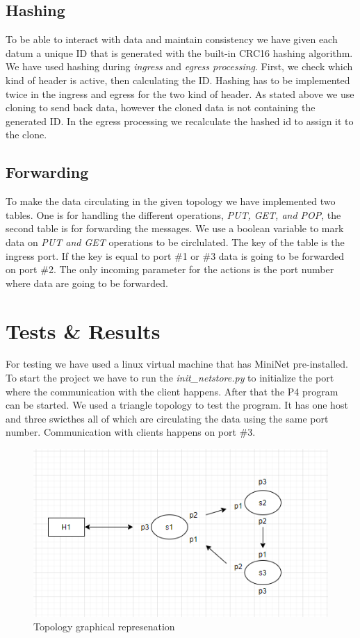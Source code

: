 \documentclass[sigconf,natbib=false]{acmart}
\begin{document}
\subsection{Hashing}
To be able to interact with data and maintain consistency we have given each datum a unique ID that is generated with the built-in CRC16 hashing \cite{hashing2} algorithm. We have used hashing during \textit{ingress} and \textit{egress processing}. First, we check which kind of header is active, then calculating the ID. Hashing has to be implemented twice in the ingress and egress for the two kind of header. As stated above we use cloning to send back data, however the cloned data is not containing the generated ID. In the egress processing we recalculate the hashed id to assign it to the clone.
\cite{hashing1}
\subsection{Forwarding}
To make the data circulating in the given topology we have implemented two tables. One is for handling the different operations, \textit{PUT, GET, and POP}, the second table is for forwarding the messages. We use a boolean variable to mark data on \textit{PUT and GET} operations to be circlulated. The key of the table is the ingress port. If the key is equal to port \#1 or \#3 data is going to be forwarded on port \#2. The only incoming parameter for the actions is the port number where data are going to be forwarded.
\section{Tests \& Results}
For testing we have used a linux virtual machine that has MiniNet pre-installed. To start the project we have to run the \textit{init\_netstore.py} to initialize the port where the communication with the client happens. After that the P4 program can be started. We used a triangle topology to test the program. It has one host and three swicthes all of which are circulating the data using the same port number. Communication with clients happens on port \#3.
\begin{figure}[ht]
	\caption{Topology graphical represenation}
	\includegraphics[scale=0.7]{top.png}
	\centering
\end{figure}
\end{document}
